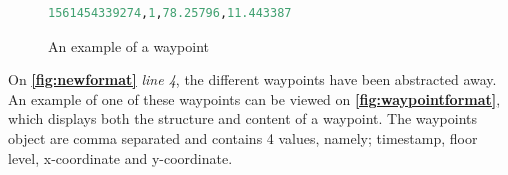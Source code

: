 \begin{figure}[H]
\lstset{numbers=left}
\begin{lstlisting}[language=Python]
1561454339274,1,78.25796,11.443387
\end{lstlisting}
\caption{An example of a waypoint}
\label{fig:waypointformat}
\end{figure}

On \textbf{\autoref{fig:newformat}} \textit{line 4}, the different waypoints have been abstracted away. An example of one of these waypoints can be viewed on \textbf{\autoref{fig:waypointformat}}, which displays both the structure and content of a waypoint. The waypoints object are comma separated and contains 4 values, namely; timestamp, floor level, x-coordinate and y-coordinate.

